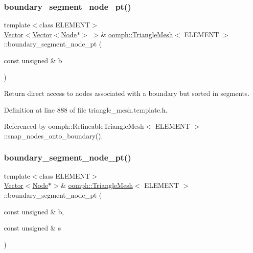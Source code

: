 \subsubsection{\texorpdfstring{boundary\+\_\+segment\+\_\+node\+\_\+pt()}{boundary\_segment\_node\_pt()}\hspace{0.1cm}{\footnotesize\ttfamily [1/3]}}
{\footnotesize\ttfamily template$<$class E\+L\+E\+M\+E\+NT$>$ \\
\hyperlink{classoomph_1_1Vector}{Vector}$<$\hyperlink{classoomph_1_1Vector}{Vector}$<$\hyperlink{classoomph_1_1Node}{Node}$\ast$$>$ $>$\& \hyperlink{classoomph_1_1TriangleMesh}{oomph\+::\+Triangle\+Mesh}$<$ E\+L\+E\+M\+E\+NT $>$\+::boundary\+\_\+segment\+\_\+node\+\_\+pt (\begin{DoxyParamCaption}\item[{const unsigned \&}]{b }\end{DoxyParamCaption})\hspace{0.3cm}{\ttfamily [inline]}}



Return direct access to nodes associated with a boundary but sorted in segments. 



Definition at line 888 of file triangle\+\_\+mesh.\+template.\+h.



Referenced by oomph\+::\+Refineable\+Triangle\+Mesh$<$ E\+L\+E\+M\+E\+N\+T $>$\+::snap\+\_\+nodes\+\_\+onto\+\_\+boundary().

\mbox{\label{classoomph_1_1TriangleMesh_afcfb27b6a9230629edbcf7b2f1cfbe48}} 
\subsubsection{\texorpdfstring{boundary\+\_\+segment\+\_\+node\+\_\+pt()}{boundary\_segment\_node\_pt()}\hspace{0.1cm}{\footnotesize\ttfamily [2/3]}}
{\footnotesize\ttfamily template$<$class E\+L\+E\+M\+E\+NT$>$ \\
\hyperlink{classoomph_1_1Vector}{Vector}$<$\hyperlink{classoomph_1_1Node}{Node}$\ast$$>$\& \hyperlink{classoomph_1_1TriangleMesh}{oomph\+::\+Triangle\+Mesh}$<$ E\+L\+E\+M\+E\+NT $>$\+::boundary\+\_\+segment\+\_\+node\+\_\+pt (\begin{DoxyParamCaption}\item[{const unsigned \&}]{b,  }\item[{const unsigned \&}]{s }\end{DoxyParamCaption})\hspace{0.3cm}{\ttfamily [inline]}}



